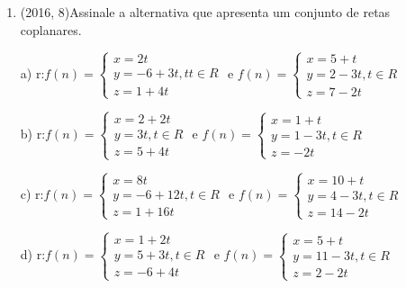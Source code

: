 \documentclass{article}
\begin{document}
\begin{enumerate}
\item (2016, 8)Assinale a alternativa que apresenta um conjunto de retas coplanares.\newline

a) r:$
f(n) = \left \{ \begin{matrix} 
x=2t\\
y = -6 +3t, t t \in R\\
z = 1 + 4t
\end{matrix} \right.$ e 
$
f(n) = \left \{ \begin{matrix} 
x=5 + t\\
y = 2 - 3t, t \in R\\
z = 7-2t
\end{matrix} \right.$\newline

b) r:$
f(n) = \left \{ \begin{matrix} 
x=2 + 2t\\
y = 3t, t \in R\\
z = 5 + 4t
\end{matrix} \right.$ e 
$
f(n) = \left \{ \begin{matrix} 
x=1 + t\\
y = 1 - 3t, t \in R\\
z = -2t
\end{matrix} \right.$\newline

c) r:$
f(n) = \left \{ \begin{matrix} 
x = 8t\\
y = -6 + 12t, t \in R\\
z = 1 + 16t
\end{matrix} \right.$ e 
$
f(n) = \left \{ \begin{matrix} 
x = 10 + t\\
y = 4 - 3t, t \in R\\
z = 14 -2t
\end{matrix} \right.$\newline

d) r:$
f(n) = \left \{ \begin{matrix} 
x = 1 + 2t\\
y = 5 + 3t, t \in R\\
z = -6 + 4t
\end{matrix} \right.$ e 
$
f(n) = \left \{ \begin{matrix} 
x = 5 + t\\
y = 11 - 3t, t \in R\\
z = 2 -2t
\end{matrix} \right.$\newline


\end{enumerate}
\end{document}
